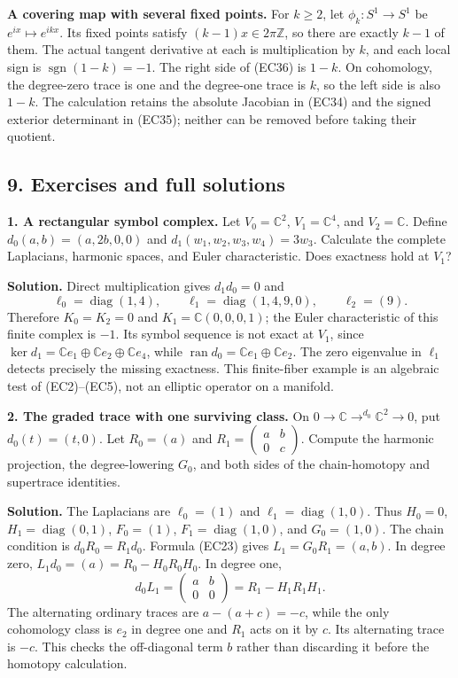 \documentclass[
  11pt,
]{article}
\begin{document}
\textbf{A covering map with several fixed points.} For \(k\ge2\), let
\(\phi_k:S^1\to S^1\) be \(e^{ix}\mapsto e^{ikx}\). Its fixed points
satisfy \((k-1)x\in2\pi\mathbb Z\), so there are exactly \(k-1\) of
them. The actual tangent derivative at each is multiplication by \(k\),
and each local sign is \(\operatorname{sgn}(1-k)=-1\). The right side of
(EC36) is \(1-k\). On cohomology, the degree-zero trace is one and the
degree-one trace is \(k\), so the left side is also \(1-k\). The
calculation retains the absolute Jacobian in (EC34) and the signed
exterior determinant in (EC35); neither can be removed before taking
their quotient.

\subsection{9. Exercises and full
solutions}\label{exercises-and-full-solutions}

\textbf{1. A rectangular symbol complex.} Let \(V_0=\mathbb C^2\),
\(V_1=\mathbb C^4\), and \(V_2=\mathbb C\). Define
\(d_0(a,b)=(a,2b,0,0)\) and \(d_1(w_1,w_2,w_3,w_4)=3w_3\). Calculate the
complete Laplacians, harmonic spaces, and Euler characteristic. Does
exactness hold at \(V_1\)?

\textbf{Solution.} Direct multiplication gives \(d_1d_0=0\) and \[
 \ell_0=\operatorname{diag}(1,4),\qquad
 \ell_1=\operatorname{diag}(1,4,9,0),\qquad
 \ell_2=(9).
 \tag{EC39}
\] Therefore \(K_0=K_2=0\) and \(K_1=\mathbb C(0,0,0,1)\); the Euler
characteristic of this finite complex is \(-1\). Its symbol sequence is
not exact at \(V_1\), since
\(\ker d_1=\mathbb C e_1\oplus\mathbb C e_2\oplus\mathbb C e_4\), while
\(\operatorname{ran}d_0=\mathbb C e_1\oplus\mathbb C e_2\). The zero
eigenvalue in \(\ell_1\) detects precisely the missing exactness. This
finite-fiber example is an algebraic test of (EC2)--(EC5), not an
elliptic operator on a manifold.

\textbf{2. The graded trace with one surviving class.} On
\(0\to\mathbb C\mathop{\to}^{d_0}\mathbb C^2\to0\), put
\(d_0(t)=(t,0)\). Let \(R_0=(a)\) and
\(R_1=\begin{pmatrix}a&b\\0&c\end{pmatrix}\). Compute the harmonic
projection, the degree-lowering \(G_0\), and both sides of the
chain-homotopy and supertrace identities.

\textbf{Solution.} The Laplacians are \(\ell_0=(1)\) and
\(\ell_1=\operatorname{diag}(1,0)\). Thus \(H_0=0\),
\(H_1=\operatorname{diag}(0,1)\), \(F_0=(1)\),
\(F_1=\operatorname{diag}(1,0)\), and \(G_0=(1,0)\). The chain condition
is \(d_0R_0=R_1d_0\). Formula (EC23) gives \(L_1=G_0R_1=(a,b)\). In
degree zero, \(L_1d_0=(a)=R_0-H_0R_0H_0\). In degree one, \[
 d_0L_1=\begin{pmatrix}a&b\\0&0\end{pmatrix}
       =R_1-H_1R_1H_1.
 \tag{EC40}
\] The alternating ordinary traces are \(a-(a+c)=-c\), while the only
cohomology class is \(e_2\) in degree one and \(R_1\) acts on it by
\(c\). Its alternating trace is \(-c\). This checks the off-diagonal
term \(b\) rather than discarding it before the homotopy calculation.
\end{document}
